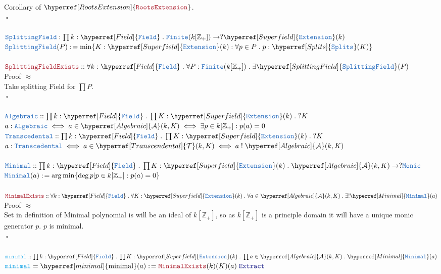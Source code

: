 \documentclass[12pt]{article}
\newcommand{\TYPE}[1]{\textcolor{NavyBlue}{\mathtt{#1}}}
\newcommand{\FUNC}[1]{\textcolor{Cerulean}{\mathtt{#1}}}
\newcommand{\LOGIC}[1]{\textcolor{Blue}{\mathtt{#1}}}
\newcommand{\THM}[1]{\textcolor{Maroon}{\mathtt{#1}}}
\renewcommand{\.}{\; . \;}
\newcommand{\de}{: \kern 0.1pc =}
\newcommand{\IsNot}{\; ! \;}
\newcommand{\NNInt}{\mathbb{Z}_{+} }
\DeclareMathOperator*{\argmin}{arg\,min}
\newcommand{\E}{ \; \LOGIC{Extract} }
\newcommand{\QED}{\; \square}
\newcommand{\Field}{\hyperref[Field]{\TYPE{Field}}}
\newcommand{\Superfield}{\hyperref[Superfield]{\TYPE{Extension}}}
\newcommand{\Splits}{\hyperref[Splits]{\TYPE{Splits}}}
\newcommand{\SF}{\hyperref[SplittingField]{\TYPE{SplittingField}}}
\newcommand{\Al}{\hyperref[Algebraic]{\mathcal{A}}}
\newcommand{\Tr}{\hyperref[Transcendental]{\mathcal{T}}}
\newcommand{\Minimal}{\hyperref[Minimal]{\TYPE{Minimal}}}
\newcommand{\minimal}{\hyperref[minimal]{\mathrm{minimal}}}
\newcommand{\RE}{\hyperref[RootsExtension]{\THM{RootsExtension}}}
\begin{document}
Corollary of $\RE$. \\
$\QED$
\\ \\
$
\TYPE{SplittingField} :  \prod  k : \Field \. \TYPE{Finite} (k[\NNInt]) \to ?\Superfield(k) 
$ \\
$
 \TYPE{SplittingField}(P) \de \min \{ K : \Superfield(k) : \forall p \in P \. p : \Splits(K)  \}  \label{SplittingField}
$
\\ \\
$\THM{SplittingFieldExists} :: \forall k : \Field \. \forall P : \TYPE{Finite} (k[\NNInt]) \. \exists  \SF(P) $ \\
Proof $\approx$ \\
Take splitting Field for $\prod P$.\\
$\QED$
\\ \\
$\TYPE{Algebraic} :: \prod k : \Field \. \prod K : \Superfield(k) \. ? K$ \\
$a : \TYPE{Algebraic} \iff a \in \Al(k,K) \iff \exists p \in k[\NNInt] : p(a) = 0  $
\label{Algebraic}
\newpage
$\TYPE{Transcedental} :: \prod k : \Field \. \prod K : \Superfield(k) \. ? K$ \\
$a : \TYPE{Transcedental} \iff a \in \Tr(k,K) \iff a \IsNot \Al(k,K) $
\label{Transcedental}
\\ \\
$\TYPE{Minimal} :: \prod k : \Field \. \prod K : \Superfield(k) \.  \Al(k,K) \to ?\TYPE{Monic}$ \\
$\TYPE{Minimal}(a) \de \argmin \{ \deg p | p \in k[\NNInt] : p(a) = 0 \} $
\label{Minimal}
\\ \\
$\THM{MinimalExists} :: \forall
 k : \Field \. \forall K : \Superfield(k) \.  \forall a \in \Al(k,K) 
 \. \exists ! \Minimal (a)  $\\
 Proof $\approx$ \\
 Set in definition of Minimal  polynomial is  will be an ideal of $k[\NNInt]$, so as
 $k[\NNInt]$ is a principle domain it will have a unique monic generator $p$. $p$ is minimal.\\
$\QED$
\\ \\
$\FUNC{minimal} :: \prod k : \Field \. \prod K : \Superfield(k) \. \prod a \in \Al(k,K) \. \Minimal(a) $ \\
$\FUNC{minimal} = \minimal (a) \de \THM{MinimalExists}(k)(K)(a) \E $
\label{minimal}
\\ \\
\end{document}
